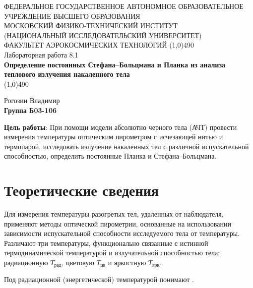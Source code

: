 \documentclass[a4paper,12pt]{article}
\begin{document}
\begin{titlepage}
\begin{center}
\large{\small ФЕДЕРАЛЬНОЕ ГОСУДАРСТВЕННОЕ АВТОНОМНОЕ ОБРАЗОВАТЕЛЬНОЕ\\ УЧРЕЖДЕНИЕ ВЫСШЕГО ОБРАЗОВАНИЯ \\ МОСКОВСКИЙ ФИЗИКО-ТЕХНИЧЕСКИЙ ИНСТИТУТ\\ (НАЦИОНАЛЬНЫЙ ИССЛЕДОВАТЕЛЬСКИЙ УНИВЕРСИТЕТ)\\ ФАКУЛЬТЕТ АЭРОКОСМИЧЕСКИХ ТЕХНОЛОГИЙ}
\vfill
\line(1,0){490}\\[1mm]
\huge{Лабораторная работа 8.1}\\
\huge\textbf{Определение постоянных Стефана–Больцмана и Планка из анализа теплового излучения накаленного тела}\\
\line(1,0){490}\\[1mm]
\vfill
\begin{flushright}
\normalsize{Рогозин Владимир}\\
\normalsize{\textbf{Группа Б03-106}}\\
\end{flushright}
\end{center}
\end{titlepage}

\textbf{Цель работы}:
При помощи модели абсолютно черного тела (АЧТ) провести измерения температуры оптическим пирометром с исчезающей нитью и термопарой,
исследовать излучение накаленных тел с различной испускательной способностью, определить постоянные Планка и Стефана–Больцмана.




\section{Теоретические сведения}
Для измерения температуры разогретых тел, удаленных от наблюдателя, применяют методы оптической пирометрии, основанные на использовании зависимости испускательной способности исследуемого тела от температуры. Различают три температуры, функционально связанные с истинной термодинамической температурой и излучательной способностью тела: радиационную $T_\text{рад}$, цветовую $T_\text{цв}$ и яркостную $T_\text{ярк}$.

Под радиационной (энергетической) температурой понимают .
\end{document}
